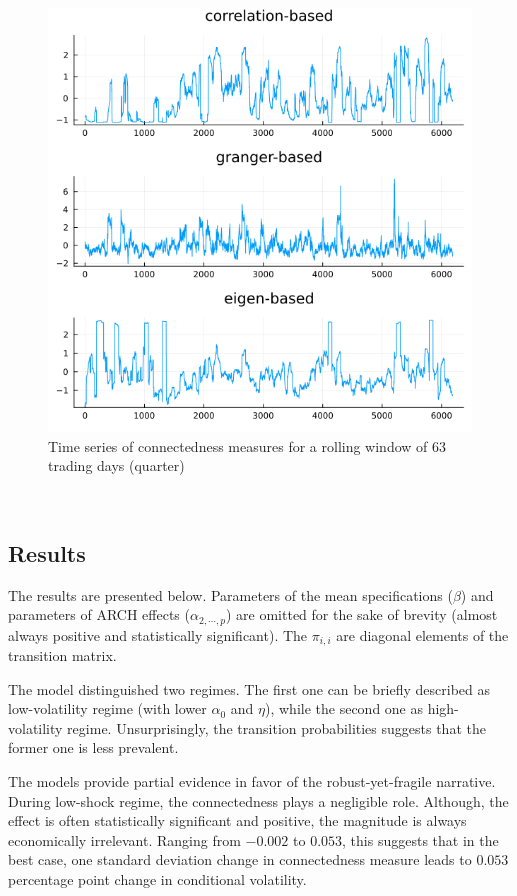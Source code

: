 \documentclass{article}
\begin{document}
\begin{figure}[H]
  \caption{Time series of connectedness measures for a rolling window of 63 trading days (quarter)}
  \includegraphics[scale=0.5]{connectmeasures.png}
  \centering
\end{figure}

\

\subsection*{Results}

The results are presented below. Parameters of the mean specifications ($\beta$) and parameters of ARCH effects ($\alpha_{2,\cdots,p}$) are omitted for the sake of brevity (almost always positive and statistically significant). The $\pi_{i,i}$ are diagonal elements of the transition matrix.

The model distinguished two regimes. The first one can be briefly described as low-volatility regime (with lower $\alpha_0$ and $\eta$), while the second one as high-volatility regime. Unsurprisingly, the transition probabilities suggests that the former one is less prevalent. 

The models provide partial evidence in favor of the robust-yet-fragile narrative. During low-shock regime, the connectedness plays a negligible role. Although, the effect is often statistically significant and positive, the magnitude is always economically irrelevant. Ranging from $-0.002$ to $0.053$, this suggests that in the best case, one standard deviation change in connectedness measure leads to $0.053$ percentage point change in conditional volatility. 
\end{document}
